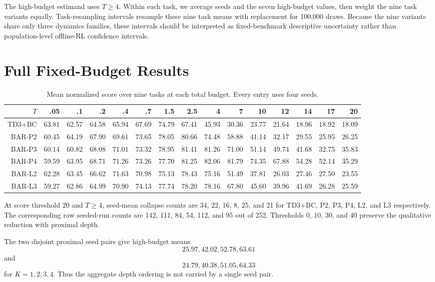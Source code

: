 \documentclass[twoside]{article}
\begin{document}
The high-budget estimand uses $T\ge4$. Within each task, we average seeds and the seven high-budget values, then weight the nine task variants equally. Task-resampling intervals resample these nine task means with replacement for 100,000 draws. Because the nine variants share only three dynamics families, these intervals should be interpreted as fixed-benchmark descriptive uncertainty rather than population-level offline-RL confidence intervals.

\section{Full Fixed-Budget Results}
\begin{table}[h]
\caption{Mean normalized score over nine tasks at each total budget. Every entry uses four seeds.}
\centering\small
\setlength{\tabcolsep}{4.2pt}
\begin{tabular}{r|rrrrrrrrrrrrrr}
\toprule
$T$&.05&.1&.2&.4&.7&1.5&2.5&4&7&10&12&14&17&20\\
\midrule
TD3+BC&63.81&62.57&64.58&65.94&67.69&74.79&67.41&45.93&30.36&23.77&21.64&18.96&18.92&18.09\\
BAR-P2&60.45&64.19&67.90&69.61&73.65&78.05&80.66&74.48&58.88&41.14&32.17&29.55&25.95&26.25\\
BAR-P3&60.14&60.82&68.08&71.01&73.32&78.95&81.41&81.26&71.00&51.14&49.74&41.68&32.75&35.83\\
BAR-P4&59.59&63.95&68.71&71.26&73.26&77.70&81.25&82.06&81.79&74.35&67.88&54.28&52.14&35.29\\
BAR-L2&62.28&63.45&66.62&71.63&70.98&75.13&78.43&75.16&51.49&37.81&26.03&27.46&27.50&23.55\\
BAR-L3&59.27&62.86&64.99&70.90&74.13&77.74&78.20&78.16&67.80&45.60&39.96&41.69&26.28&25.59\\
\bottomrule
\end{tabular}
\end{table}

At score threshold 20 and $T\ge4$, seed-mean collapse counts are 34, 22, 16, 8, 25, and 21 for TD3+BC, P2, P3, P4, L2, and L3 respectively. The corresponding raw seeded-run counts are 142, 111, 84, 54, 112, and 95 out of 252. Thresholds 0, 10, 30, and 40 preserve the qualitative reduction with proximal depth.

The two disjoint proximal seed pairs give high-budget means
\[
25.97,42.02,52.78,63.61
\]
and
\[
24.79,40.38,51.05,64.33
\]
for $K=1,2,3,4$. Thus the aggregate depth ordering is not carried by a single seed pair.
\end{document}
